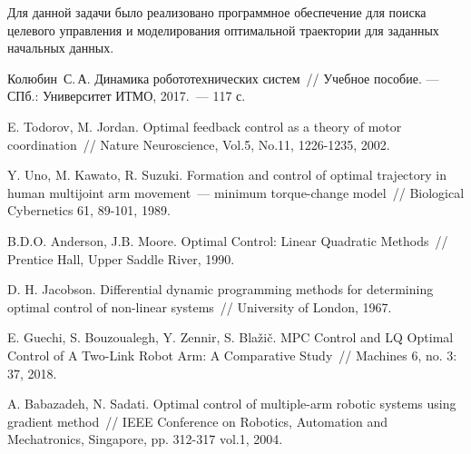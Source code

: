 \begin{lmrarticle}
    Для данной задачи было реализовано программное обеспечение для поиска целевого управления и моделирования оптимальной траектории для заданных начальных данных.
    
    \begin{lmrreferences}
    \item Колюбин~С.\,А. Динамика робототехнических систем~// Учебное пособие. --- СПб.: Университет ИТМО, 2017.~--- 117 с.
    \item E. Todorov, M. Jordan. Optimal feedback control as a theory of motor coordination~// Nature Neuroscience, Vol.5, No.11, 1226-1235, 2002.
    \item Y. Uno, M. Kawato, R. Suzuki. Formation and control of optimal trajectory in human multijoint arm movement~--- minimum torque-change model~// Biological Cybernetics 61, 89-101, 1989.
    \item B.D.O. Anderson, J.B. Moore. Optimal Control: Linear Quadratic Methods~// Prentice Hall, Upper Saddle River, 1990.
    \item D. H. Jacobson. Differential dynamic programming methods for determining optimal control of non-linear systems~// University of London, 1967.
    \item E. Guechi, S. Bouzoualegh, Y. Zennir, S. Blažič. MPC Control and LQ Optimal Control of A Two-Link Robot Arm: A Comparative Study~// Machines 6, no. 3: 37, 2018.
    \item A. Babazadeh, N. Sadati. Optimal control of multiple-arm robotic systems using gradient method~// IEEE Conference on Robotics, Automation and Mechatronics, Singapore, pp. 312-317 vol.1, 2004.
    \end{lmrreferences}
    \end{lmrarticle}
    
